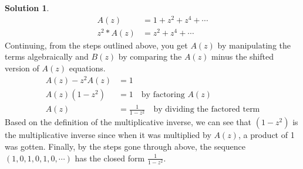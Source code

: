 \documentclass{article}
\theoremstyle{definition}
\newtheorem*{solution}{Solution}
\begin{document}
\begin{solution}
\begin{align*}
A(z) &= 1 + z^2 + z^4 + \cdots\\
z^2 * A(z) &= z^2 + z^4 + \cdots
\end{align*}
Continuing, from the steps outlined above, you get $A(z)$ by manipulating the terms algebraically and $B(z)$ by comparing the $A(z)$ minus the shifted version of $A(z)$ equations.
\begin{align*}
A(z) - z^2A(z) &= 1\\
A(z)(1 - z^2) &= 1 \quad \mbox{by factoring $A(z)$}\\
A(z) &= \frac{1}{1-z^2} \quad \mbox{by dividing the factored term}
\end{align*}
Based on the definition of the multiplicative inverse, we can see that $(1-z^2)$ is the multiplicative inverse since when it was multiplied by $A(z)$, a product of 1 was gotten. Finally, by the steps gone through above, the sequence $(1,0,1,0,1,0,\cdots)$ has the closed form $\frac{1}{1-z^2}$.
\end{solution}
\end{document}
